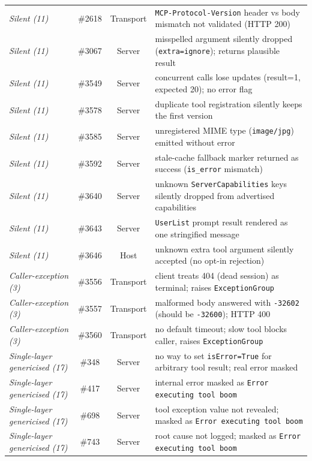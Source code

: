 \begin{table}[!t]
\begin{tabularx}{\textwidth}{@{}>{\centering\arraybackslash}X{} >{\centering\arraybackslash}c >{\centering\arraybackslash}c >{\arraybackslash}X{}@{}}
\emph{Silent (11)} & \#2618 & Transport & \texttt{MCP-Protocol-Version} header vs body mismatch not validated (HTTP 200) \\
\emph{Silent (11)} & \#3067 & Server & misspelled argument silently dropped (\texttt{extra=ignore}); returns plausible result \\
\emph{Silent (11)} & \#3549 & Server & 20 concurrent calls lose updates (result=1, expected 20); no error flag \\
\emph{Silent (11)} & \#3578 & Server & duplicate tool registration silently keeps the first version \\
\emph{Silent (11)} & \#3585 & Server & unregistered MIME type (\texttt{image/jpg}) emitted without error \\
\emph{Silent (11)} & \#3592 & Server & stale-cache fallback marker returned as success (\texttt{is\_error} mismatch) \\
\emph{Silent (11)} & \#3640 & Server & unknown \texttt{ServerCapabilities} keys silently dropped from advertised capabilities \\
\emph{Silent (11)} & \#3643 & Server & \texttt{UserList} prompt result rendered as one stringified message \\
\emph{Silent (11)} & \#3646 & Host & unknown extra tool argument silently accepted (no opt-in rejection) \\
\midrule
\emph{Caller-exception (3)} & \#3556 & Transport & client treats 404 (dead session) as terminal; raises \texttt{ExceptionGroup} \\
\emph{Caller-exception (3)} & \#3557 & Transport & malformed body answered with \texttt{-32602} (should be \texttt{-32600}); HTTP 400 \\
\emph{Caller-exception (3)} & \#3560 & Transport & no default timeout; slow tool blocks caller, raises \texttt{ExceptionGroup} \\
\midrule
\emph{Single-layer genericised (17)} & \#348 & Server & no way to set \texttt{isError=True} for arbitrary tool result; real error masked \\
\emph{Single-layer genericised (17)} & \#417 & Server & internal error masked as \texttt{Error executing tool boom} \\
\emph{Single-layer genericised (17)} & \#698 & Server & tool exception value not revealed; masked as \texttt{Error executing tool boom} \\
\emph{Single-layer genericised (17)} & \#743 & Server & root cause not logged; masked as \texttt{Error executing tool boom} \\

\end{tabularx}
\end{table}
